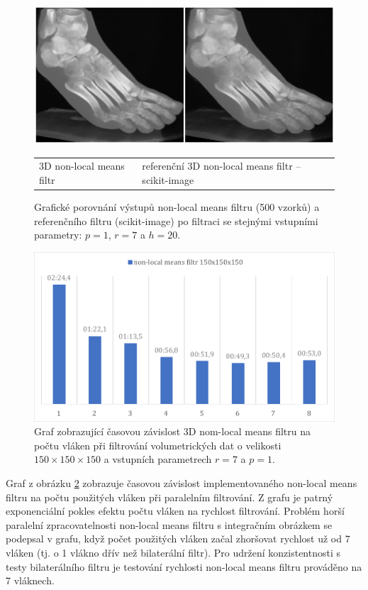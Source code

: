 \begin{figure} [H]
    \centering
    \label{fig:results:3dnlm_vs_scikit}
    \includegraphics[width=1\textwidth]{figures/3dnlm_vs_scikit.png}
    \begin{tabularx}{1\textwidth}{>{\centering}X>{\centering}X}
        3D non-local means filtr & referenční 3D non-local means filtr -- scikit-image
    \end{tabularx}
    \caption{Grafické porovnání výstupů non-local means filtru (500 vzorků) a referenčního filtru (scikit-image) po filtraci se stejnými vstupními parametry: $p=1$, $r=7$ a $h=20$.}
\end{figure}

\begin{figure} [H]
    \centering
    \label{fig:results:3dnlm_threads}
    \includegraphics[width=1\textwidth]{figures/3dnlm_threads.pdf}
    \caption{Graf zobrazující časovou závislost 3D nom-local means filtru na počtu vláken při filtrování volumetrických dat o velikosti $150\times150\times150$ a vstupních parametrech $r=7$ a $p=1$.}
\end{figure}

Graf z obrázku \ref{fig:results:3dnlm_threads} zobrazuje časovou závislost implementovaného non-local means filtru na počtu použitých vláken při paralelním filtrování. Z grafu je patrný exponenciální
pokles efektu počtu vláken na rychlost filtrování. Problém horší paralelní zpracovatelnosti non-local means filtru s integračním obrázkem se podepsal v grafu, když počet použitých vláken začal zhoršovat rychlost už od 7 vláken (tj. o 1 vlákno dřív než bilaterální filtr). Pro udržení konzistentnosti s testy bilaterálního filtru je testování rychlosti non-local means filtru prováděno na 7 vláknech. 

